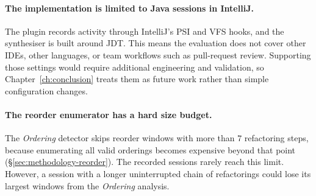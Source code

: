 \paragraph{The implementation is limited to Java sessions in IntelliJ.}
The plugin records activity through IntelliJ's PSI and VFS hooks, and the synthesiser is built around JDT. This means the evaluation does not cover other IDEs, other languages, or team workflows such as pull-request review. Supporting those settings would require additional engineering and validation, so Chapter~\ref{ch:conclusion} treats them as future work rather than simple configuration changes.

\paragraph{The reorder enumerator has a hard size budget.}
The \emph{Ordering} detector skips reorder windows with more than $7$ refactoring steps, because enumerating all valid orderings becomes expensive beyond that point (\S\ref{sec:methodology-reorder}). The recorded sessions rarely reach this limit. However, a session with a longer uninterrupted chain of refactorings could lose its largest windows from the \emph{Ordering} analysis.

\label{sec:threats-internal}
\label{sec:threats-statistical}
\label{sec:threats-per-experiment}
\label{sec:threats-implementation}
\label{sec:threats-out-of-scope}
